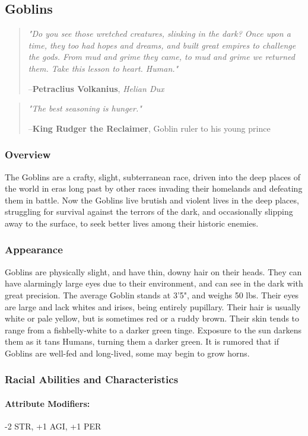 \documentclass[oneside,11pt,english]{book}
\begin{document}
\subsection{Goblins}\label{sec:goblins}
\begin{quotation}
	\emph{"Do you see those wretched creatures, slinking in the dark? Once upon a time, they too had hopes and dreams, and built great empires to challenge the gods. From mud and grime they came, to mud and grime we returned them. Take this lesson to heart. Human."}\par
	\hfill--\textbf{Petraclius Volkanius}, \textit{Helian Dux}
\end{quotation}
\begin{quote} 
	\emph{"The best seasoning is hunger."}

	\hfill--\textbf{King Rudger the Reclaimer}, Goblin ruler to his young prince 
\end{quote}
\subsubsection*{Overview} 
The Goblins are a crafty, slight, subterranean race, driven into the deep places of the world in eras long 
past by other races invading their homelands and defeating them in battle. Now the Goblins live brutish 
and violent lives in the deep places, struggling for survival against the terrors of the dark, and 
occasionally slipping away to the surface, to seek better lives among their historic enemies. 
\subsubsection*{Appearance} 
Goblins are physically slight, and have thin, downy hair on their heads. They can have alarmingly large 
eyes due to their environment, and can see in the dark with great precision. The average Goblin stands at 
3'5", and weighs 50 lbs. Their eyes are large and lack whites and irises, being entirely pupillary. Their 
hair is usually white or pale yellow, but is sometimes red or a ruddy brown. Their skin tends to range 
from a fishbelly-white to a darker green tinge. Exposure to the sun darkens them as it tans Humans, 
turning them a darker green. It is rumored that if Goblins are well-fed and long-lived, some may begin to 
grow horns. 
\subsubsection*{Racial Abilities and Characteristics} 
\paragraph{Attribute Modifiers:} -2 STR, +1 AGI, +1 PER 
\end{document}
